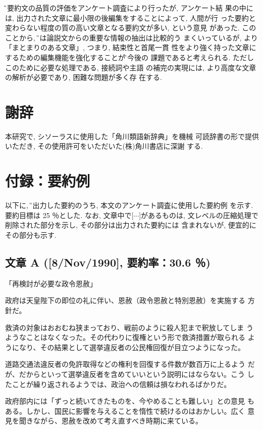 \G の要約文の品質の評価をアンケート調査により行ったが, アンケート結
果の中には, 出力された文章に最小限の後編集をすることによって, 人間が行
った要約と変わらない程度の質の高い文章となる要約文が多い, という意見
があった. このことから, \G では論説文からの重要な情報の抽出は比較的う
まくいっているが, より「まとまりのある文章」, つまり, 結束性と首尾一貫
性をより強く持った文章にするための編集機能を強化することが\G の今後の
課題であると考えられる. ただしこのために必要な処理である, 接続詞や主語
の補完の実現には, より高度な文章の解析が必要であり, 困難な問題が多く存
在する. 


\section*{謝辞}
本研究で, シソーラスに使用した「角川類語新辞典」\cite{角川類語}を機械
可読辞書の形で提供いただき, その使用許可をいただいた(株)角川書店に深謝
する. 






\newpage

\section*{付録：要約例}
以下に, \G で出力した要約のうち, 本文のアンケート調査に使用した要約例
を示す. 要約目標は 25 ％とした. なお, 文章中で[$\cdots$]があるものは, 
文レベルの圧縮処理で削除された部分を示し, その部分は出力された要約には
含まれないが, 便宜的にその部分も示す. 

\subsection*{文章 A  {\rm ([8/Nov/1990], 要約率：30.6 ％)}}
\centerline{\large 「再検討が必要な政令恩赦」}

政府は天皇陛下の即位の礼に伴い、恩赦（政令恩赦と特別恩赦）を実施する
方針だ。

救済の対象はおおむね狭まっており、戦前のように殺人犯まで釈放してしま
うようなことはなくなった。その代わりに復権という形で救済措置が取られる
ようになり、その結果として選挙違反者の公民権回復が目立つようになった。

道路交通法違反者の免許取得などの権利を回復する件数が数百万に上るよう
だが、だからといって選挙違反者を含めていいという説明にはならない。こう
したことが繰り返されるようでは、政治への信頼は損なわれるばかりだ。

政府部内には「ずっと続いてきたものを、今やめることも難しい」との意見
もある。しかし、国民に影響を与えることを惰性で続けるのはおかしい。広く
意見を聞きながら、恩赦を改めて考え直すべき時期に来ている。


